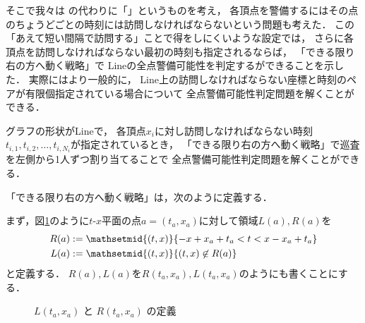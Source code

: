 そこで我々は
{\idletime}の代わりに「{\interval}」というものを考え，
各頂点を警備するにはその点の{\interval}ちょうどごとの時刻には訪問しなければならないという問題も考えた．
この「あえて短い間隔で訪問する」ことで得をしにくいような設定では，
さらに各頂点を訪問しなければならない最初の時刻も指定されるならば，
「できる限り右の方へ動く戦略」で
Lineの全点警備可能性を判定するができることを示した．
実際にはより一般的に，
Line上の訪問しなければならない座標と時刻のペアが有限個指定されている場合について
全点警備可能性判定問題を解くことができる．



\begin{theo}
	\label{theo:LineExactFinite}
	グラフの形状がLineで，
	各頂点$x_i$に対し訪問しなければならない時刻
	$t_{i,1}, t_{i,2}, \ldots, t_{i,{N_i}}$が指定されているとき，
	「できる限り右の方へ動く戦略」で巡査を左側から1人ずつ割り当てることで
	全点警備可能性判定問題を解くことができる．
\end{theo}


「できる限り右の方へ動く戦略」は，次のように定義する．

まず，図\ref{tikz:defLR}のように$t$-$x$平面の点$a = (t_a,x_a)$に対して領域$L(a), R(a)$を
\begin{align*}
	R(a) &:= \mathsetmid{(t,x)}{ -x + x_a + t_a < t < x - x_a + t_a } \\
	L(a) &:= \mathsetmid{(t,x)}{ (t,x) \not\in R(a) }
\end{align*}
と定義する．
$R(a),L(a)$を$R(t_a,x_a),L(t_a,x_a)$のようにも書くことにする．

\begin{figure}[h]
	\centering
	\caption{$L(t_a,x_a)$ と $R(t_a,x_a)$ の定義 \label{tikz:defLR}}
\end{figure}



